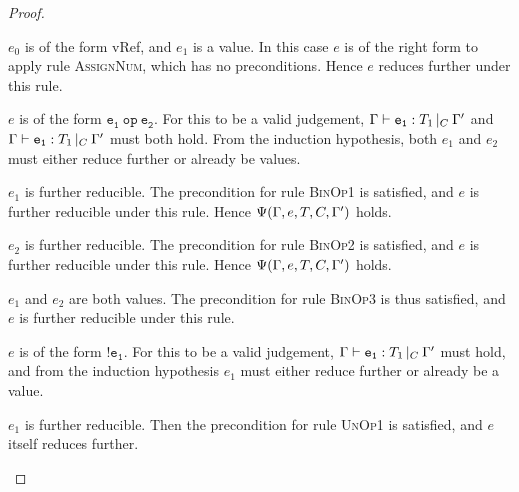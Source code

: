 \documentclass[a4paper]{article}
\theoremstyle{definition}
\theoremstyle{dotless}
\begin{document}
\begin{proof}
\begin{case}[NumAssignType]
  	\begin{subcase}
	  $e_0$ is of the form vRef, and $e_1$ is a value.
	  In this case $e$ is of the right form to apply rule \textsc{AssignNum},
	  which has no preconditions. Hence $e$ reduces further under this rule.
  	\end{subcase}

  \end{case}

  \begin{case}\label{binoptype}

  	$e$ is of the form $\mathtt{e_1\ op\ e_2}$. For this to be a valid
  	judgement, $\Gamma{}\vdash\mathtt{e_1}: T_1\,|_C\:\Gamma'$ and $\Gamma{}\vdash\mathtt{e_1}: T_1\,|_C\:\Gamma'$ must both hold. From
  	the induction hypothesis, both $e_1$ and $e_2$ must either reduce further
  	or already be values.

  	\begin{subcase}
  	  $e_1$ is further reducible.
  	  The precondition for rule \textsc{BinOp1} is
  	  satisfied, and $e$ is further reducible under this rule. Hence
  	  $\Psi(\Gamma, e, T, C, \Gamma')$ holds.
 	\end{subcase}

  	\begin{subcase}
  	  $e_2$ is further reducible.
  	  The precondition for rule \textsc{BinOp2} is
  	  satisfied, and $e$ is further reducible under this rule. Hence
  	  $\Psi(\Gamma, e, T, C, \Gamma')$ holds.
 	\end{subcase}

	\begin{subcase}
	  $e_1$ and $e_2$ are both values. 
	  The precondition for rule \textsc{BinOp3} is thus satisfied, and $e$ is
	  further reducible under this rule.
	\end{subcase}
  \end{case}

  \begin{case}[NegType]\label{negtype}

	$e$ is of the form $\mathtt{!e_1}$. For this to be a valid judgement,
	$\Gamma{}\vdash\mathtt{e_1}: T_1\,|_C\:\Gamma'$ must hold, and from the induction hypothesis $e_1$ must
	either reduce further or already be a value.

	\begin{subcase}
	  $e_1$ is further reducible.
	  Then the precondition for rule \textsc{UnOp1}
	  is satisfied, and $e$ itself reduces further.
	\end{subcase}


\end{case}
\end{proof}
\end{document}
